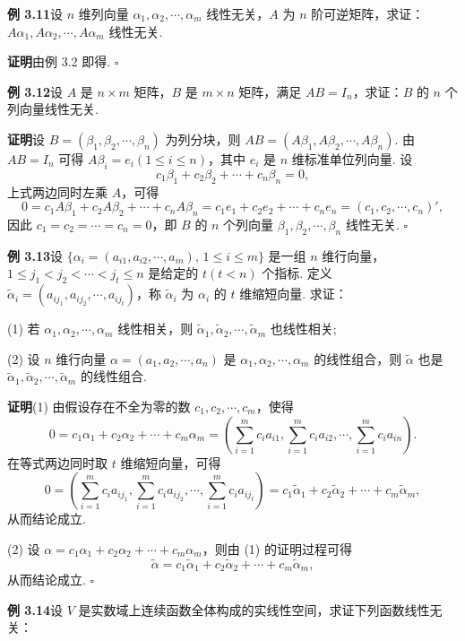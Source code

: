 \documentclass[UTF8,12pt,a4paper,fontset=fandol]{ctexart}
\begin{document}
\noindent\textbf{例 3.11}\quad 设 $n$ 维列向量 $\alpha_1,\alpha_2,\cdots,\alpha_m$ 线性无关，$A$ 为 $n$ 阶可逆矩阵，求证：$A\alpha_1,A\alpha_2,\cdots,A\alpha_m$ 线性无关.

\noindent\textbf{证明}\quad 由例 3.2 即得. $\square$

\noindent\textbf{例 3.12}\quad 设 $A$ 是 $n\times m$ 矩阵，$B$ 是 $m\times n$ 矩阵，满足 $AB=I_n$，求证：$B$ 的 $n$ 个列向量线性无关.

\noindent\textbf{证明}\quad 设 $B=(\beta_1,\beta_2,\cdots,\beta_n)$ 为列分块，则 $AB=(A\beta_1,A\beta_2,\cdots,A\beta_n)$. 由 $AB=I_n$ 可得 $A\beta_i=e_i(1\le i\le n)$，其中 $e_i$ 是 $n$ 维标准单位列向量. 设
\[
c_1\beta_1+c_2\beta_2+\cdots+c_n\beta_n=0,
\]
上式两边同时左乘 $A$，可得
\[
0=c_1A\beta_1+c_2A\beta_2+\cdots+c_nA\beta_n=c_1e_1+c_2e_2+\cdots+c_ne_n=(c_1,c_2,\cdots,c_n)',
\]
因此 $c_1=c_2=\cdots=c_n=0$，即 $B$ 的 $n$ 个列向量 $\beta_1,\beta_2,\cdots,\beta_n$ 线性无关. $\square$

\noindent\textbf{例 3.13}\quad 设 $\{\alpha_i=(a_{i1},a_{i2},\cdots,a_{in}),\,1\le i\le m\}$ 是一组 $n$ 维行向量，$1\le j_1<j_2<\cdots<j_t\le n$ 是给定的 $t(t<n)$ 个指标. 定义 $\widetilde\alpha_i=(a_{ij_1},a_{ij_2},\cdots,a_{ij_t})$，称 $\widetilde\alpha_i$ 为 $\alpha_i$ 的 $t$ 维缩短向量. 求证：

(1) 若 $\alpha_1,\alpha_2,\cdots,\alpha_m$ 线性相关，则 $\widetilde\alpha_1,\widetilde\alpha_2,\cdots,\widetilde\alpha_m$ 也线性相关;

(2) 设 $n$ 维行向量 $\alpha=(a_1,a_2,\cdots,a_n)$ 是 $\alpha_1,\alpha_2,\cdots,\alpha_m$ 的线性组合，则 $\widetilde\alpha$ 也是 $\widetilde\alpha_1,\widetilde\alpha_2,\cdots,\widetilde\alpha_m$ 的线性组合.

\noindent\textbf{证明}\quad (1) 由假设存在不全为零的数 $c_1,c_2,\cdots,c_m$，使得
\[
0=c_1\alpha_1+c_2\alpha_2+\cdots+c_m\alpha_m=
\left(\sum_{i=1}^m c_i a_{i1},\sum_{i=1}^m c_i a_{i2},\cdots,\sum_{i=1}^m c_i a_{in}\right).
\]
在等式两边同时取 $t$ 维缩短向量，可得
\[
0=\left(\sum_{i=1}^m c_i a_{ij_1},\sum_{i=1}^m c_i a_{ij_2},\cdots,\sum_{i=1}^m c_i a_{ij_t}\right)
=c_1\widetilde\alpha_1+c_2\widetilde\alpha_2+\cdots+c_m\widetilde\alpha_m,
\]
从而结论成立.

(2) 设 $\alpha=c_1\alpha_1+c_2\alpha_2+\cdots+c_m\alpha_m$，则由 (1) 的证明过程可得
\[
\widetilde\alpha=c_1\widetilde\alpha_1+c_2\widetilde\alpha_2+\cdots+c_m\widetilde\alpha_m,
\]
从而结论成立. $\square$

\noindent\textbf{例 3.14}\quad 设 $V$ 是实数域上连续函数全体构成的实线性空间，求证下列函数线性无关：
\end{document}
